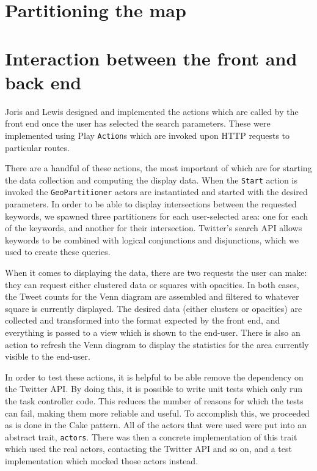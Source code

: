 \section{Partitioning the map}
\label{sec:partitioning}

\section{Interaction between the front and back end}
\label{sec:task_controller}

Joris and Lewis designed and implemented the actions which are called by the
front end once the user has selected the search parameters.  These were
implemented using Play \verb+Action+s which are invoked upon HTTP requests to
particular routes.

There are a handful of these actions, the most important of which are for
starting the data collection and computing the display data.  When the
\verb+Start+ action is invoked the \verb+GeoPartitioner+ actors are
instantiated and started with the desired parameters.  In order to be able to
display intersections between the requested keywords, we spawned three
partitioners for each user-selected area: one for each of the keywords, and
another for their intersection.  Twitter's search API allows keywords to be
combined with logical conjunctions and disjunctions, which we used to create
these queries.

When it comes to displaying the data, there are two requests the user can make:
they can request either clustered data or squares with opacities.  In both
cases, the Tweet counts for the Venn diagram are assembled and filtered to
whatever square is currently displayed.  The desired data (either clusters or
opacities) are collected and transformed into the format expected
by the front end, and everything is passed to a view which is shown to the
end-user.  There is also an action to refresh the Venn diagram to display the
statistics for the area currently visible to the end-user.

In order to test these actions, it is helpful to be able remove the dependency
on the Twitter API.  By doing this, it is possible to write unit tests which
only run the task controller code.  This reduces the number of reasons for which
the tests can fail, making them more reliable and useful.  To accomplish this,
we proceeded as is done in the Cake pattern.  All of the actors that were used
were put into an abstract trait, \verb+actors+.  There was then a concrete
implementation of this trait which used the real actors, contacting the Twitter
API and so on, and a test implementation which mocked those actors instead.

